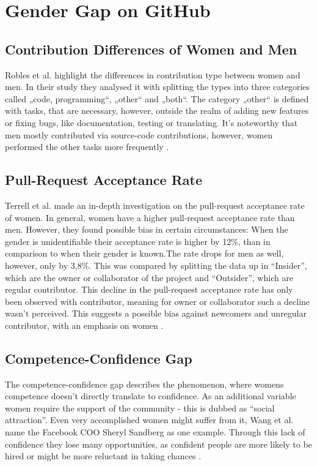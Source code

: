 \documentclass[a4paper, 11pt]{article}
\begin{document}
\section{Gender Gap on GitHub} \label{sec:gender-gap-github}

\subsection{Contribution Differences of Women and Men}
Robles et al. highlight the differences in contribution type between women and men. In their study they analysed it with splitting the types into three categories called „code, programming“, „other“ and „both“. The category „other“ is defined with tasks, that are necessary, however, outside the realm of adding new features or fixing bugs, like documentation, testing or translating. It’s noteworthy that men mostly contributed via source-code contributions, however, women performed the other tasks more frequently \cite{women-floss}.

\subsection{Pull-Request Acceptance Rate}
Terrell et al. made an in-depth investigation on the pull-request acceptance rate of women. In general, women have a higher pull-request acceptance rate than men. However, they found possible bias in certain circumstances: When the gender is unidentifiable their acceptance rate is higher by 12\%, than in comparison to when their gender is known.The rate drops for men as well, however, only by 3,8\%. This was compared by splitting the data up in “Insider”, which are the owner or collaborator of the project and “Outsider”, which are regular contributor. This decline in the pull-request acceptance rate has only been observed with contributor, meaning for owner or collaborator such a decline wasn’t perceived. This suggests a possible bias against newcomers and unregular contributor, with an emphasis on women \cite{pull-acceptance-women}.

\subsection{Competence-Confidence Gap}
The competence-confidence gap describes the phenomenon, where womens competence doesn’t directly translate to confidence. As an additional variable women require the support of the community - this is dubbed as “social attraction”. Even very accomplished women might suffer from it, Wang et al. name the Facebook COO Sheryl Sandberg as one example. Through this lack of confidence they lose many opportunities, as confident people are more likely to be hired or might be more reluctant in taking chances \cite{competence-confidence-gap}. \newline
\end{document}
